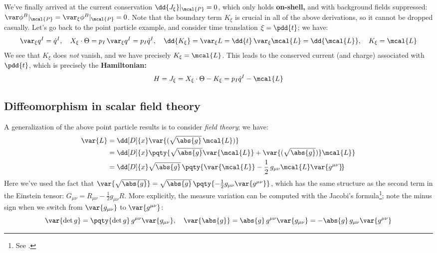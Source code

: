 \documentclass[a4paper
	,10pt
]{article}
\begin{document}
	We've finally arrived at the current conservation $\dd{J_\xi}|_{\mcal{P}} = 0$, which only holds \textbf{on-shell,} and with background fields suppressed: $\var \phi^B|_{\mcal{P}} = \var_\xi \phi^B|_{\mcal{P}} = 0$. Note that the boundary term $K_\xi$ is crucial in all of the above derivations, so it cannot be dropped casually. Let's go back to the point particle example, and consider time translation $\xi = \pdd{t}$; we have:
	\begin{equation}
		\var_\xi {q^I} = \dot{q}^I,
	\quad
		X_\xi\cdot\Theta
		= p_I \,\var_\xi{q^I}
		= p_I \dot{q}^I,
	\quad
		\dd{K_\xi}
		= \var_\xi{L}
		= \dd{t}\,\var_\xi \mcal{L}
		= \dd{\mcal{L}},
	\quad
		K_\xi
		= \mcal{L}
	\end{equation}
	We see that $K_\xi$ does \textit{not} vanish, and we have precisely $K_\xi = \mcal{L}$. This leads to the conserved current (and charge) associated with $\pdd{t}$, which is precisely the \textbf{Hamiltonian:}
	\begin{equation}
		H = J_\xi
		= X_\xi \cdot \Theta - K_\xi
		= p_I \dot{q}^I - \mcal{L}
	\end{equation}
\subsection{Diffeomorphism in scalar field theory}
	A generalization of the above point particle results is to consider \textit{field theory}; we have:
	\begin{equation}
	\begin{aligned}
		\var{L}
		&= \dd[D]{x} \var{(\sqrt{\abs{g}}\,\mcal{L})} \\
		&= \dd[D]{x} \pqty{
				\sqrt{\abs{g}} \var{\mcal{L}}
				+ \var{(\sqrt{\abs{g}})} \mcal{L}
			} \\
		&= \dd[D]{x} \sqrt{\abs{g}}\,\pqty{
				\var{\mcal{L}}
				- \frac{1}{2}\,
					g_{\mu\nu} \mcal{L}
					\var{g^{\mu\nu}} \!
			} \\
	\end{aligned}
	\label{eq:Lagrangian_form_to_density}
	\end{equation}
	Here we've used the fact that $
		\var{\sqrt{\abs{g}}}
		= \sqrt{\abs{g}}\,\pqty{
			- \frac{1}{2} g_{\mu\nu} \var{g^{\mu\nu}}
		}
	$, which has the same structure as the second term in the Einstein tensor: $
		G_{\mu\nu}
		= R_{\mu\nu} - \frac{1}{2} g_{\mu\nu} R
	$. More explicitly, the measure variation can be computed with the Jacobi's formula\footnote{
		See . 
	}; note the minus sign when we switch from $\var{g_{\mu\nu}}$ to $\var{g^{\mu\nu}}$:
	\begin{equation}
		\var{\det g}
		= \pqty{\det g}\,g^{\mu\nu} \var{g_{\mu\nu}},
	\quad
		\var{\abs{g}}
		= \abs{g}\,g^{\mu\nu} \var{g_{\mu\nu}}
		= - \abs{g}\,g_{\mu\nu} \var{g^{\mu\nu}}
	\label{eq:measure_variation}
	\end{equation}
	
\end{document}
